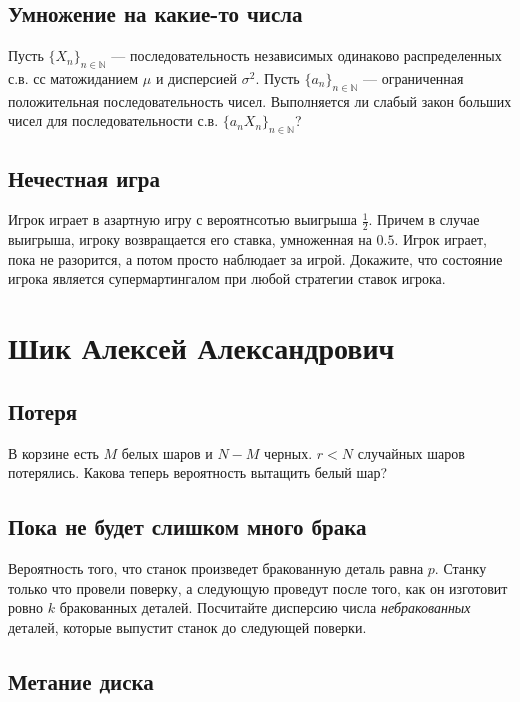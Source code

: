\documentclass[12pt]{article}
\newcommand\N{\mathbb{N}}
\begin{document}
\subsection{Умножение на какие-то числа}

Пусть $\{X_n\}_{n \in \N}$ --- последовательность независимых одинаково распределенных с.в. сс матожиданием $\mu$ и дисперсией $\sigma^2$. Пусть $\{a_n\}_{n \in \N}$ --- ограниченная положительная последовательность чисел. Выполняется ли слабый закон больших чисел для последовательности с.в. $\{a_n X_n\}_{n \in \N}$?



\subsection{Нечестная игра}

Игрок играет в азартную игру с вероятнсотью выигрыша $\frac{1}{2}$. Причем в случае выигрыша, игроку возвращается его ставка, умноженная на $0.5$. Игрок играет, пока не разорится, а потом просто наблюдает за игрой. Докажите, что состояние игрока является супермартингалом при любой стратегии ставок игрока.



\newpage
\section{Шик Алексей Александрович}

\subsection{Потеря}

В корзине есть $M$ белых шаров и $N - M$ черных. $r < N$ случайных шаров потерялись. Какова теперь вероятность вытащить белый шар?



\subsection{Пока не будет слишком много брака}

Вероятность того, что станок произведет бракованную деталь равна $p$. Станку только что провели поверку, а следующую проведут после того, как он изготовит ровно $k$ бракованных деталей. Посчитайте дисперсию числа \emph{небракованных} деталей, которые выпустит станок до следующей поверки.



\subsection{Метание диска}
\end{document}
